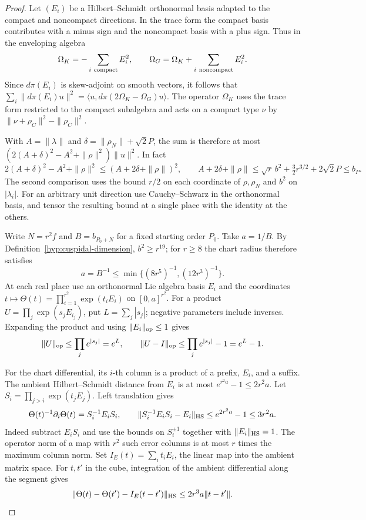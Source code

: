 \begin{proof}
Let \((E_i)\) be a Hilbert--Schmidt orthonormal basis
adapted to the compact and noncompact directions. In the trace
form the compact basis contributes with a minus sign and the
noncompact basis with a plus sign. Thus in the enveloping algebra
\[
 \Omega_K=-\sum_{i\ {\rm compact}}E_i^2,\qquad
 \Omega_G=\Omega_K+\sum_{i\ {\rm noncompact}}E_i^2.
\]
Since \(d\pi(E_i)\) is skew-adjoint on smooth vectors, it follows
that \(\sum_i\|d\pi(E_i)u\|^2
=\langle u,d\pi(2\Omega_K-\Omega_G)u\rangle\). The operator \(\Omega_K\) uses the trace form
restricted to the compact subalgebra and acts on a compact type
\(\nu\) by \(\|\nu+\rho_C\|^2-\|\rho_C\|^2\).

With
\(A=\|\lambda\|\) and \(\delta=\|\rho_N\|+\sqrt2 P\), the sum is
therefore at most \((2(A+\delta)^2-A^2+\|\rho\|^2)\|u\|^2\).
In fact
\[
 2(A+\delta)^2-A^2+\|\rho\|^2
        \le (A+2\delta+\|\rho\|)^2,\qquad
 A+2\delta+\|\rho\|
        \le \sqrt r\,b^2+\tfrac32r^{3/2}+2\sqrt2 P\le b_P .
\]
The second comparison uses the bound \(r/2\) on each coordinate
of \(\rho,\rho_N\) and \(b^2\) on \(|\lambda_i|\). For an arbitrary unit direction use
Cauchy--Schwarz in the orthonormal basis, and tensor the resulting
bound at a single place with the identity at the others.


Write \(N=r^2 f\) and \(B=b_{P_0+N}\) for a fixed starting order
\(P_0\). Take \(a=1/B\). By Definition~\ref{hyp:cuspidal-dimension}, \(b^2\ge r^{19}\);
for \(r\ge8\) the chart radius therefore satisfies
\[
   a=B^{-1}\le\min\{(8r^5)^{-1},(12r^3)^{-1}\}.
\]
At each real place use an orthonormal Lie algebra basis \(E_i\)
and the coordinates
\(t\mapsto\Theta(t)=\prod_{i=1}^{r^2}\exp(t_i E_i)\) on
\([0,a]^{r^2}\). For a product \(U=\prod_j\exp(s_j E_{i_j})\), put \(L=\sum_j|s_j|\); negative parameters include inverses. Expanding the product and using \(\|E_i\|_{\rm op}\le1\) gives 
\[
 \|U\|_{\rm op}\le\prod_j e^{|s_j|}=e^L,\qquad \|U-I\|_{\rm op}\le\prod_j e^{|s_j|}-1=e^L-1.
\]

For the chart differential, its \(i\)-th column is a product of a
prefix, \(E_i\), and a suffix. The ambient Hilbert--Schmidt distance
from \(E_i\) is at most \(e^{r^2 a}-1\le 2r^2a\). Let \(S_i=\prod_{j>i}\exp(t_jE_j)\). Left translation gives
\[
 \Theta(t)^{-1}\partial_i\Theta(t)=S_i^{-1}E_i S_i,\qquad
 \|S_i^{-1}E_iS_i-E_i\|_{\rm HS}\le e^{2r^2a}-1\le3r^2a .
\]
Indeed subtract \(E_iS_i\) and use the bounds on \(S_i^{\pm1}\)
together with \(\|E_i\|_{\rm HS}=1\).
The operator norm of a map with \(r^2\) such error columns is at
most \(r\) times the maximum column norm. Set \(I_E(t)=\sum_i t_iE_i\), the linear map into the
ambient matrix space. For \(t,t'\) in the cube, integration of
the ambient differential along the segment gives
\[
 \|\Theta(t)-\Theta(t')-I_E(t-t')\|_{\rm HS}
                         \le 2r^3a\|t-t'\| .
\]


\end{proof}
